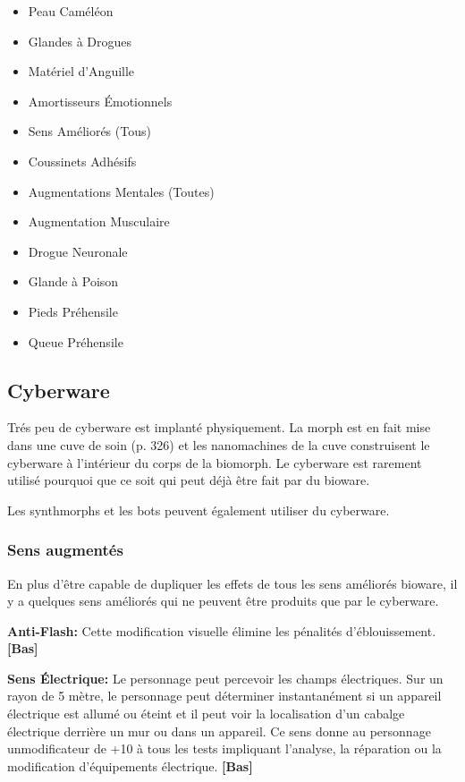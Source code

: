 {{\begin{itemize} \item Peau Caméléon \item Glandes à Drogues \item Matériel d'Anguille \item Amortisseurs Émotionnels \item Sens Améliorés (Tous) \item Coussinets Adhésifs \item Augmentations Mentales (Toutes) \item Augmentation Musculaire \item Drogue Neuronale \item Glande à Poison \item Pieds Préhensile \item Queue Préhensile \end{itemize} 

\subsection{Cyberware} \label{sec:cyberware} 

Trés peu de cyberware est implanté physiquement. La morph est en fait mise dans une cuve de soin (p. 326) et les nanomachines de la cuve construisent le cyberware à l'intérieur du corps de la biomorph. Le cyberware est rarement utilisé pourquoi que ce soit qui peut déjà être fait par du bioware. 

Les synthmorphs et les bots peuvent également utiliser du cyberware. 

\subsubsection{Sens augmentés} 

En plus d'être capable de dupliquer les effets de tous les sens améliorés bioware, il y a quelques sens améliorés qui ne peuvent être produits que par le cyberware. 

\textbf{Anti-Flash:} Cette modification visuelle élimine les pénalités d'éblouissement. \textbf{[Bas]} 

\textbf{Sens Électrique:} Le personnage peut percevoir les champs électriques. Sur un rayon de 5 mètre, le personnage peut déterminer instantanément si un appareil électrique est allumé ou éteint et il peut voir la localisation d'un cabalge électrique derrière un mur ou dans un appareil. Ce sens donne au personnage unmodificateur de +10 à tous les tests impliquant l'analyse, la réparation ou la modification d'équipements électrique. \textbf{[Bas]} 

}}
